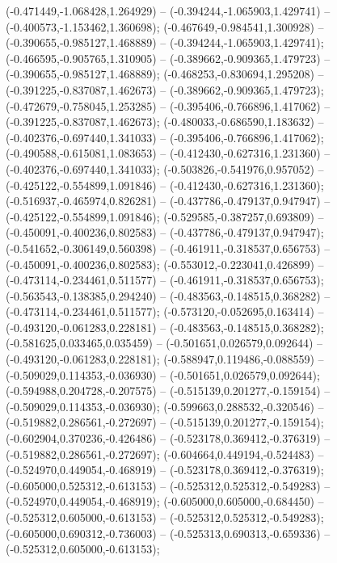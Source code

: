  (-0.471449,-1.068428,1.264929) -- (-0.394244,-1.065903,1.429741) -- (-0.400573,-1.153462,1.360698);
 (-0.467649,-0.984541,1.300928) -- (-0.390655,-0.985127,1.468889) -- (-0.394244,-1.065903,1.429741);
 (-0.466595,-0.905765,1.310905) -- (-0.389662,-0.909365,1.479723) -- (-0.390655,-0.985127,1.468889);
 (-0.468253,-0.830694,1.295208) -- (-0.391225,-0.837087,1.462673) -- (-0.389662,-0.909365,1.479723);
 (-0.472679,-0.758045,1.253285) -- (-0.395406,-0.766896,1.417062) -- (-0.391225,-0.837087,1.462673);
 (-0.480033,-0.686590,1.183632) -- (-0.402376,-0.697440,1.341033) -- (-0.395406,-0.766896,1.417062);
 (-0.490588,-0.615081,1.083653) -- (-0.412430,-0.627316,1.231360) -- (-0.402376,-0.697440,1.341033);
 (-0.503826,-0.541976,0.957052) -- (-0.425122,-0.554899,1.091846) -- (-0.412430,-0.627316,1.231360);
 (-0.516937,-0.465974,0.826281) -- (-0.437786,-0.479137,0.947947) -- (-0.425122,-0.554899,1.091846);
 (-0.529585,-0.387257,0.693809) -- (-0.450091,-0.400236,0.802583) -- (-0.437786,-0.479137,0.947947);
 (-0.541652,-0.306149,0.560398) -- (-0.461911,-0.318537,0.656753) -- (-0.450091,-0.400236,0.802583);
 (-0.553012,-0.223041,0.426899) -- (-0.473114,-0.234461,0.511577) -- (-0.461911,-0.318537,0.656753);
 (-0.563543,-0.138385,0.294240) -- (-0.483563,-0.148515,0.368282) -- (-0.473114,-0.234461,0.511577);
 (-0.573120,-0.052695,0.163414) -- (-0.493120,-0.061283,0.228181) -- (-0.483563,-0.148515,0.368282);
 (-0.581625,0.033465,0.035459) -- (-0.501651,0.026579,0.092644) -- (-0.493120,-0.061283,0.228181);
 (-0.588947,0.119486,-0.088559) -- (-0.509029,0.114353,-0.036930) -- (-0.501651,0.026579,0.092644);
 (-0.594988,0.204728,-0.207575) -- (-0.515139,0.201277,-0.159154) -- (-0.509029,0.114353,-0.036930);
 (-0.599663,0.288532,-0.320546) -- (-0.519882,0.286561,-0.272697) -- (-0.515139,0.201277,-0.159154);
 (-0.602904,0.370236,-0.426486) -- (-0.523178,0.369412,-0.376319) -- (-0.519882,0.286561,-0.272697);
 (-0.604664,0.449194,-0.524483) -- (-0.524970,0.449054,-0.468919) -- (-0.523178,0.369412,-0.376319);
 (-0.605000,0.525312,-0.613153) -- (-0.525312,0.525312,-0.549283) -- (-0.524970,0.449054,-0.468919);
 (-0.605000,0.605000,-0.684450) -- (-0.525312,0.605000,-0.613153) -- (-0.525312,0.525312,-0.549283);
 (-0.605000,0.690312,-0.736003) -- (-0.525313,0.690313,-0.659336) -- (-0.525312,0.605000,-0.613153);

